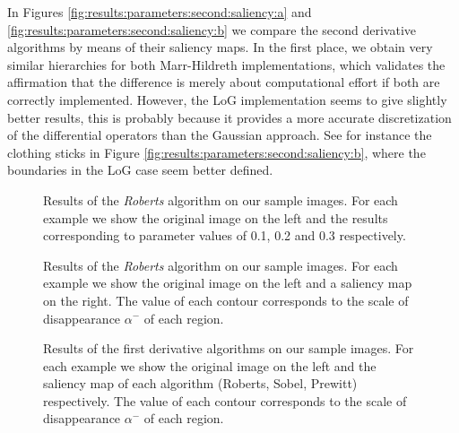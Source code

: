 \documentclass{ipol}
\numberwithin{equation}{section}
\numberwithin{table}{section}
\begin{document}
In Figures \ref{fig:results:parameters:second:saliency:a} and \ref{fig:results:parameters:second:saliency:b} we compare the second derivative algorithms by means of their saliency maps. In the first place, we obtain very similar hierarchies for both Marr-Hildreth implementations, which validates the affirmation that the difference is merely about computational effort if both are correctly implemented. However, the LoG implementation seems to give slightly better results, this is probably because it provides a more accurate discretization of the differential operators than the Gaussian approach. See for instance the clothing sticks in Figure \ref{fig:results:parameters:second:saliency:b}, where the boundaries in the LoG case seem better defined.


\renewcommand{\anchocinco}{2.5cm}
\newcommand{\anchocuatro}{4.5cm}

\begin{figure}[ht]
  \centering
{}
  \caption{Results of the \textit{Roberts} algorithm on our sample images. For each example we show the original image on the left and the results corresponding to parameter values of 0.1, 0.2 and 0.3 respectively.}
  \label{fig:results:parameters:roberts:parameter}
\end{figure}

\renewcommand{\anchocuatro}{8cm}
\begin{figure}[ht]
  \centering
{}
  \caption{Results of the \textit{Roberts} algorithm on our sample images. For each example we show the original image on the left and a saliency map on the right. The value of each contour corresponds to the scale of disappearance  $\alpha^-$ of each region. }
  \label{fig:results:parameters:roberts:saliency}
\end{figure}

\renewcommand{\anchocuatro}{4.5cm}

\begin{figure}[ht]
  \centering
{}
  \caption{Results of the first derivative algorithms on our sample images. For each example we show the original image on the left and the saliency map of each algorithm (Roberts, Sobel, Prewitt) respectively.
  The value of each contour corresponds to the scale of disappearance  $\alpha^-$ of each region.}
  \label{fig:results:parameters:first:saliency:a}
\end{figure}
\end{document}

